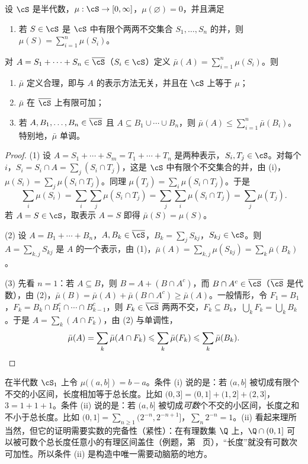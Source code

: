 \begin{lemma}\label{lem:extension:finite-additive}
设 $\cS$ 是半代数，$\mu:\cS\to[0,\infty]$，$\mu(\varnothing)=0$，并且满足
\begin{enumerate}
\item[(i)] 若 $S\in\cS$ 是 $\cS$ 中有限个两两不交集合 $S_1,\dots,S_n$ 的并，则 $\mu(S)=\sum_{i=1}^n\mu(S_i)$。
\end{enumerate}
对 $A=S_1+\cdots+S_n\in\overline\cS$（$S_i\in\cS$）定义 $\bar\mu(A)=\sum_{i=1}^n\mu(S_i)$。则
\begin{enumerate}
\item $\bar\mu$ 定义合理，即与 $A$ 的表示方法无关，并且在 $\cS$ 上等于 $\mu$；
\item $\bar\mu$ 在 $\overline\cS$ 上有限可加；
\item 若 $A,B_1,\dots,B_n\in\overline\cS$ 且 $A\subseteq B_1\cup\cdots\cup B_n$，则 $\bar\mu(A)\leqslant\sum_{i=1}^n\bar\mu(B_i)$。特别地，$\bar\mu$ 单调。
\end{enumerate}
\end{lemma}
\begin{proof}
(1) 设 $A=S_1+\cdots+S_m=T_1+\cdots+T_n$ 是两种表示，$S_i,T_j\in\cS$。对每个 $i$，$S_i=S_i\cap A=\sum_j(S_i\cap T_j)$，这是 $\cS$ 中有限个不交集合的并，由 (i)，$\mu(S_i)=\sum_j\mu(S_i\cap T_j)$。同理 $\mu(T_j)=\sum_i\mu(S_i\cap T_j)$。于是
\[
\sum_i\mu(S_i)=\sum_i\sum_j\mu(S_i\cap T_j)=\sum_j\sum_i\mu(S_i\cap T_j)=\sum_j\mu(T_j).
\]
若 $A=S\in\cS$，取表示 $A=S$ 即得 $\bar\mu(S)=\mu(S)$。

(2) 设 $A=B_1+\cdots+B_n$，$A,B_k\in\overline\cS$，$B_k=\sum_jS_{kj}$，$S_{kj}\in\cS$。则 $A=\sum_{k,j}S_{kj}$ 是 $A$ 的一个表示，由 (1)，$\bar\mu(A)=\sum_{k,j}\mu(S_{kj})=\sum_k\bar\mu(B_k)$。

(3) 先看 $n=1$：若 $A\subseteq B$，则 $B=A+(B\cap A^c)$，而 $B\cap A^c\in\overline\cS$（$\overline\cS$ 是代数），由 (2)，$\bar\mu(B)=\bar\mu(A)+\bar\mu(B\cap A^c)\geqslant\bar\mu(A)$。一般情形，令 $F_1=B_1$，$F_k=B_k\cap B_1^c\cap\cdots\cap B_{k-1}^c$，则 $F_k\in\overline\cS$ 两两不交，$F_k\subseteq B_k$，$\bigcup_kF_k=\bigcup_kB_k$。于是 $A=\sum_k(A\cap F_k)$，由 (2) 与单调性，
\[
\bar\mu(A)=\sum_k\bar\mu(A\cap F_k)\leqslant\sum_k\bar\mu(F_k)\leqslant\sum_k\bar\mu(B_k).\qedhere
\]
\end{proof}

\begin{example}[半代数上的集函数]
在半代数 $\cS_1$ 上令 $\mu((a,b])=b-a$。条件 (i) 说的是：若 $(a,b]$ 被切成有限个不交的小区间，长度相加等于总长度。比如 $(0,3]=(0,1]+(1,2]+(2,3]$，$3=1+1+1$。条件 (ii) 说的是：若 $(a,b]$ 被切成\emph{可数}个不交的小区间，长度之和不小于总长度。比如 $(0,1]=\sum_{n\geqslant1}(2^{-n},2^{-n+1}]$，$\sum_n2^{-n}=1$。(ii) 看起来理所当然，但它的证明需要实数的完备性（紧性）：在有理数集 $\Q$ 上，$\Q\cap(0,1]$ 可以被可数个总长度任意小的有理区间盖住（例题，第~\pageref{we:measures:rationals} 页），“长度”就没有可数次可加性。所以条件 (ii) 是构造中唯一需要动脑筋的地方。
\end{example}

